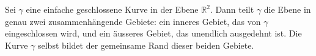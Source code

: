 \begin{satz}
%
    Sei $\gamma$ eine einfache geschlossene Kurve in der Ebene $\mathbb{R}^2$. 
    Dann teilt $\gamma$ die Ebene in genau zwei zusammenhängende Gebiete: ein inneres Gebiet, das von $\gamma$ eingeschlossen wird, und ein äusseres Gebiet, das unendlich ausgedehnt ist. 
    Die Kurve $\gamma$ selbst bildet der gemeinsame Rand dieser beiden Gebiete.
\end{satz}
